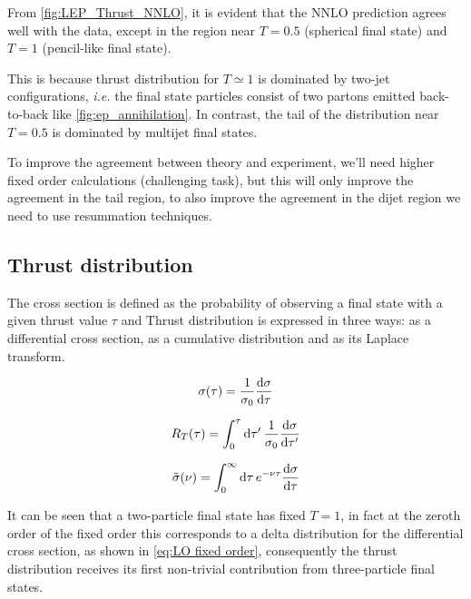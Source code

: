 \documentclass[../main.tex]{subfiles}
\begin{document}
From \cref{fig:LEP_Thrust_NNLO},  it is evident that the NNLO prediction agrees well with the data, except in the region near $T=0.5$ (spherical final state) and $T=1$ (pencil-like final state).

This is because thrust distribution for $T\simeq 1$ is dominated by two-jet configurations, \emph{i.e.} the final state particles consist of two partons emitted back-to-back like \cref{fig:ep_annihilation}.
In contrast, the tail of the distribution near $T= 0.5$ is dominated by multijet final states.

To improve the agreement between theory and experiment, we'll need higher fixed order calculations (challenging task), but this will only 
improve the agreement in the tail region, to also improve the agreement in the dijet region we need to use resummation techniques.


\subsection{Thrust distribution} \label{subsec:Thrust_distribution}

The cross section is defined as the probability of observing a final state with a given thrust value $\tau$ and Thrust distribution is expressed in three ways:
as a differential cross section, as a cumulative distribution and as its Laplace transform.

\begin{equation}\label{eq:differential_cross_section}
    \sigma(\tau) =  \frac{1}{\sigma_0} \dv{\sigma}{\tau}
\end{equation}

\begin{equation}\label{eq:cumulative_distribution}
    R_T(\tau) = \int^\tau_0 \dd{\tau'} \frac{1}{\sigma_0}\dv{\sigma}{\tau'}
\end{equation}

\begin{equation}\label{eq:Laplace transform distribution}
    \Tilde{\sigma}(\nu) = \int^\infty_0 \dd{\tau} e^{-\nu \tau} \dv{\sigma}{\tau}
\end{equation}

It can be seen that a two-particle final state has fixed $T = 1$, in fact at the zeroth order of the fixed order this corresponds to a delta distribution 
for the differential cross section, as shown in  \cref{eq:LO fixed order}, consequently the thrust distribution receives its first non-trivial contribution 
from three-particle final states.
\end{document}
